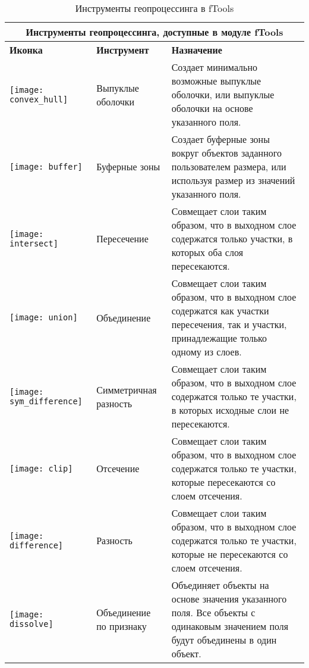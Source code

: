 \begin{table}[ht]
\centering
 \begin{tabular}{|m{1cm}|m{3cm}|m{9cm}|}
 \hline \multicolumn{3}{|c|}{\textbf{Инструменты геопроцессинга, доступные в  модуле fTools}} \\
 \hline \textbf{Иконка} & \textbf{Инструмент} & \textbf{Назначение} \\
 \hline \texttt{[image: convex\_hull]} & Выпуклые оболочки & Создает
 минимально возможные выпуклые оболочки, или выпуклые оболочки
 на основе указанного поля. \\
 \hline \texttt{[image: buffer]} & Буферные зоны & Создает
 буферные зоны вокруг объектов заданного пользователем размера, или используя
 размер из значений указанного поля. \\
 \hline \texttt{[image: intersect]} & Пересечение & Совмещает
 слои таким образом, что в выходном слое содержатся только участки, в которых оба слоя пересекаются. \\
 \hline \texttt{[image: union]} & Объединение & Совмещает
 слои таким образом, что в выходном слое содержатся как участки
 пересечения, так и участки, принадлежащие только одному из слоев. \\
 \hline \texttt{[image: sym\_difference]} & Симметричная разность &
 Совмещает слои таким образом, что в выходном слое содержатся
 только те участки, в которых исходные слои не пересекаются. \\
 \hline \texttt{[image: clip]} & Отсечение & Совмещает слои
 таким образом, что в выходном слое содержатся только те участки,
 которые пересекаются со слоем отсечения. \\
 \hline \texttt{[image: difference]} & Разность & Совмещает
 слои таким образом, что в выходном слое содержатся только те участки,
 которые не пересекаются со слоем отсечения. \\
 \hline \texttt{[image: dissolve]} & Объединение по признаку & Объединяет
 объекты на основе значения указанного поля. Все объекты с одинаковым значением поля
 будут объединены в один объект. \\
 \hline
\end{tabular}
\caption{Инструменты геопроцессинга в fTools}\label{tab:ftool_geoprocessing}
\end{table}

